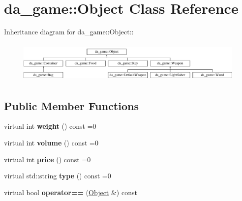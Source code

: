 \hypertarget{classda__game_1_1Object}{
\section{da\_\-game::Object Class Reference}
\label{classda__game_1_1Object}
}
Inheritance diagram for da\_\-game::Object::\begin{figure}[H]
\begin{center}
\leavevmode
\includegraphics[height=2.06135cm]{classda__game_1_1Object}
\end{center}
\end{figure}
\subsection*{Public Member Functions}
\begin{DoxyCompactItemize}
\item 
\hypertarget{classda__game_1_1Object_af8bc16da0544770ea56f9fc4b60d2d7a}{
virtual int {\bfseries weight} () const =0}
\label{classda__game_1_1Object_af8bc16da0544770ea56f9fc4b60d2d7a}

\item 
\hypertarget{classda__game_1_1Object_a725094f0008c07a674acf3eb042d457e}{
virtual int {\bfseries volume} () const =0}
\label{classda__game_1_1Object_a725094f0008c07a674acf3eb042d457e}

\item 
\hypertarget{classda__game_1_1Object_a8ffadf9d43a195e7ac69b80963833a4d}{
virtual int {\bfseries price} () const =0}
\label{classda__game_1_1Object_a8ffadf9d43a195e7ac69b80963833a4d}

\item 
\hypertarget{classda__game_1_1Object_a2571d77aaf04c5be1f6556c4c7bab0d2}{
virtual std::string {\bfseries type} () const =0}
\label{classda__game_1_1Object_a2571d77aaf04c5be1f6556c4c7bab0d2}

\item 
\hypertarget{classda__game_1_1Object_a73b5e428218a64db3e84df9f016352c2}{
virtual bool {\bfseries operator==} (\hyperlink{classda__game_1_1Object}{Object} \&) const }
\label{classda__game_1_1Object_a73b5e428218a64db3e84df9f016352c2}

\end{DoxyCompactItemize}
